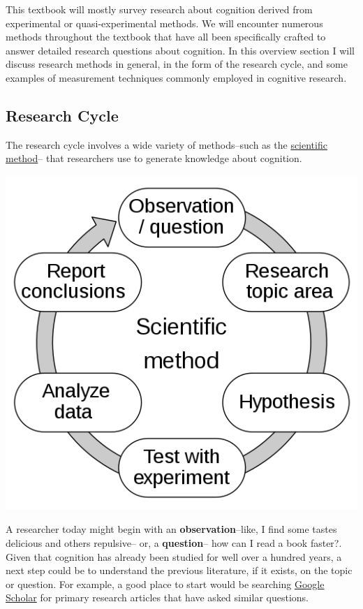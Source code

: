 \documentclass[
  oneside,
  12pt]{crumpbook}
\newenvironment{floatright50}{%
  \wrapfigure{R}{.5\textwidth}%
  }{%
  \endwrapfigure}
\begin{document}
This textbook will mostly survey research about cognition derived from experimental or quasi-experimental methods. We will encounter numerous methods throughout the textbook that have all been specifically crafted to answer detailed research questions about cognition. In this overview section I will discuss research methods in general, in the form of the research cycle, and some examples of measurement techniques commonly employed in cognitive research.

\hypertarget{research-cycle}{%
\subsection{Research Cycle}\label{research-cycle}}

The research cycle involves a wide variety of methods--such as the \href{https://en.wikipedia.org/wiki/Scientific_method}{scientific method}-- that researchers use to generate knowledge about cognition.

\begin{floatright50}
\includegraphics[width=1\linewidth]{imgs/The_Scientific_Method}

\end{floatright50}

A researcher today might begin with an \textbf{observation}--like, I find some tastes delicious and others repulsive-- or, a \textbf{question}-- how can I read a book faster?. Given that cognition has already been studied for well over a hundred years, a next step could be to understand the previous literature, if it exists, on the topic or question. For example, a good place to start would be searching \href{https://scholar.google.com}{Google Scholar} for primary research articles that have asked similar questions.
\end{document}
